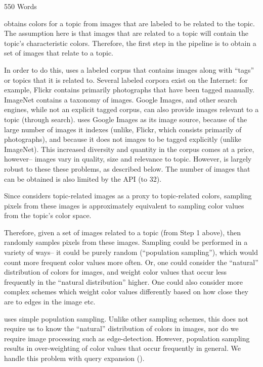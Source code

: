 550 Words


\system obtains colors for a topic from images that are labeled to be related to the topic. The assumption here is that images that are related to a topic will contain the topic's characteristic colors. Therefore, the first step in the \system pipeline is to obtain a set of images that relate to a topic.

In order to do this, \system uses a labeled corpus that contains images along with ``tags'' or topics that it is related to. Several labeled corpora exist on the Internet: for example, Flickr contains primarily photographs that have been tagged manually. ImageNet contains a taxonomy of images.  Google Images, and other search engines, while not an explicit tagged corpus, can also provide images relevant to a topic (through search). \system uses Google Images as its image source, because of the large number of images it indexes (unlike, Flickr, which consists primarily of photographs), and because it does not images to be tagged explicitly (unlike ImageNet). This increased diversity and quantity in the corpus comes at a price, however-- images vary in quality, size and relevance to topic. However, \system is largely robust to these these problems, as described below. The number of images that can be obtained is also limited by the API (to 32).

Since \system considers topic-related images as a proxy to topic-related colors, sampling pixels from these images is approximately equivalent to sampling color values from the topic's color space. 

Therefore, given a set of images related to a topic (from Step 1 above), \system then randomly samples pixels from these images. Sampling could be performed in a variety of ways-- it could be purely random (``population sampling''), which would count more frequent color values more often. Or, one could consider the ``natural'' distribution of colors for images, and weight color values that occur less frequently in the ``natural distribution'' higher. One could also consider more complex schemes which weight color values differently based on how close they are to edges in the image etc.

\system uses simple population sampling. Unlike other sampling schemes, this does not require us to know the ``natural'' distribution of colors in images, nor do we require image processing such as edge-detection. However, population sampling results in over-weighting of color values that occur frequently in general. We handle this problem with query expansion ().

